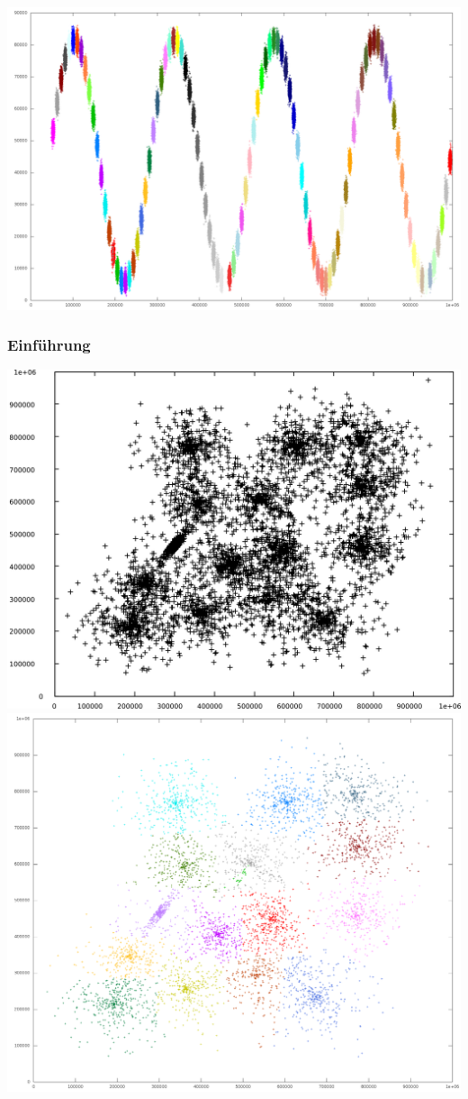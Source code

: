 \documentclass[10pt]{beamer}
\begin{document}
\begin{frame}
	\frametitle{}
	\includegraphics[scale=0.25, keepaspectratio]{../output/pics/sine.png}
\end{frame}
\begin{frame}
	\frametitle{Einf\"uhrung}
	\includegraphics[scale=0.15, keepaspectratio]{../output/pics/s3_black.png}
	\includegraphics[scale=0.13, keepaspectratio]{../output/pics/s3_colored.png}
\end{frame}
\end{document}
